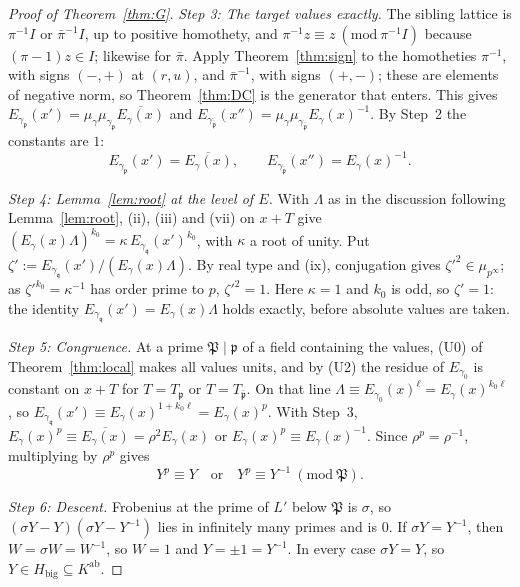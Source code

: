 \documentclass[11pt]{amsart}
\numberwithin{equation}{section}
\theoremstyle{plain}
\theoremstyle{definition}
\theoremstyle{remark}
\newcommand{\Kab}{K^{\mathrm{ab}}}
\begin{document}
\begin{proof}[Proof of Theorem~\ref{thm:G}]
\emph{Step 3: The target values exactly.} The sibling lattice is \(\pi^{-1}I\) or \(\bar\pi^{-1}I\), up to positive homothety, and \(\pi^{-1}z\equiv z\ (\mathrm{mod}\ \pi^{-1}I)\) because \((\pi-1)z\in I\); likewise for \(\bar\pi\). Apply Theorem~\ref{thm:sign} to the homotheties \(\pi^{-1}\), with signs \((-,+)\) at \((r,u)\), and \(\bar\pi^{-1}\), with signs \((+,-)\); these are elements of negative norm, so Theorem~\ref{thm:DC} is the generator that enters. This gives \(E_{\gamma_{\mathfrak p}}(x')=\mu_\gamma\mu_{\gamma_{\mathfrak p}}\overline{E_\gamma(x)}\) and \(E_{\gamma_{\bar{\mathfrak p}}}(x'')=\mu_\gamma\mu_{\gamma_{\bar{\mathfrak p}}}E_\gamma(x)^{-1}\). By Step~2 the constants are \(1\):
\[E_{\gamma_{\mathfrak p}}(x')=\overline{E_\gamma(x)},\qquad E_{\gamma_{\bar{\mathfrak p}}}(x'')=E_\gamma(x)^{-1}.\]

\emph{Step 4: Lemma~\ref{lem:root} at the level of \(E\).} With \(\Lambda\) as in the discussion following Lemma~\ref{lem:root}, (ii), (iii) and (vii) on \(x+T\) give \((E_\gamma(x)\Lambda)^{k_0}=\kappa\,E_{\gamma_{\mathfrak q}}(x')^{k_0}\), with \(\kappa\) a root of unity. Put \(\zeta':=E_{\gamma_{\mathfrak q}}(x')/(E_\gamma(x)\Lambda)\). By real type and (ix), conjugation gives \(\zeta'^2\in\mu_{p^\infty}\); as \(\zeta'^{k_0}=\kappa^{-1}\) has order prime to \(p\), \(\zeta'^2=1\). Here \(\kappa=1\) and \(k_0\) is odd, so \(\zeta'=1\): the identity \(E_{\gamma_{\mathfrak q}}(x')=E_\gamma(x)\Lambda\) holds exactly, before absolute values are taken.

\emph{Step 5: Congruence.} At a prime \(\mathfrak P\mid\mathfrak p\) of a field containing the values, (U0) of Theorem~\ref{thm:local} makes all values units, and by (U2) the residue of \(E_{\gamma_0}\) is constant on \(x+T\) for \(T=T_{\mathfrak p}\) or \(T=T_{\bar{\mathfrak p}}\). On that line \(\Lambda\equiv E_{\gamma_0}(x)^\ell=E_\gamma(x)^{k_0\ell}\), so \(E_{\gamma_{\mathfrak q}}(x')\equiv E_\gamma(x)^{1+k_0\ell}=E_\gamma(x)^p\). With Step~3, \(E_\gamma(x)^p\equiv\overline{E_\gamma(x)}=\rho^2E_\gamma(x)\) or \(E_\gamma(x)^p\equiv E_\gamma(x)^{-1}\). Since \(\rho^p=\rho^{-1}\), multiplying by \(\rho^p\) gives
\[Y^p\equiv Y\quad\text{or}\quad Y^p\equiv Y^{-1}\ (\mathrm{mod}\ \mathfrak P).\]

\emph{Step 6: Descent.} Frobenius at the prime of \(L'\) below \(\mathfrak P\) is \(\sigma\), so \((\sigma Y-Y)(\sigma Y-Y^{-1})\) lies in infinitely many primes and is \(0\). If \(\sigma Y=Y^{-1}\), then \(W=\sigma W=W^{-1}\), so \(W=1\) and \(Y=\pm1=Y^{-1}\). In every case \(\sigma Y=Y\), so \(Y\in H_{\mathrm{big}}\subseteq\Kab\).
\end{proof}
\end{document}
